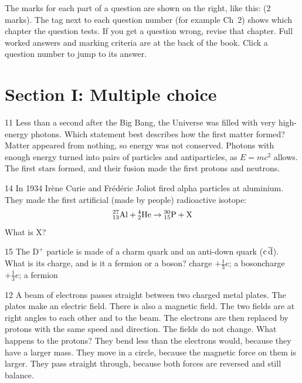 The marks for each part of a question are shown on the right, like this:
\textcolor{hscmuted}{\small(2 marks)}. The tag next to each question number (for example
\textcolor{hscbrand}{Ch~2}) shows which chapter the question tests. If you get a question
wrong, revise that chapter. Full worked answers and marking criteria are at the back of the
book. Click a question number to jump to its answer.

\section*{Section I: Multiple choice}

\begin{practiceq}{1}{1}\label{pq:bigbang}
Less than a second after the Big Bang, the Universe was filled with very high-energy photons.
Which statement best describes how the first matter formed?
  {Matter appeared from nothing, so energy was not conserved.}
  {Photons with enough energy turned into pairs of particles and antiparticles, as
   $E = mc^2$ allows.}
  {The first stars formed, and their fusion made the first protons and neutrons.}
\end{practiceq}

\begin{practiceq}{1}{4}\label{pq:joliot}
In 1934 Ir\`ene Curie and Fr\'ed\'eric Joliot fired alpha particles at aluminium. They made
the first artificial (made by people) radioactive isotope:
\[
  \pracNuc{27}{13}{Al} + \pracNuc{4}{2}{He} \to \pracNuc{30}{15}{P} + \mathrm{X}
\]
What is X?
\end{practiceq}

\begin{practiceq}{1}{5}\label{pq:dmeson}
The $\mathrm{D}^+$ particle is made of a charm quark and an anti-down quark
($\mathrm{c}\,\overline{\mathrm{d}}$). What is its charge, and is it a fermion or a boson?
  {charge $+\tfrac13 e$; a boson}{charge $+\tfrac13 e$; a fermion}
\end{practiceq}

\begin{practiceq}{1}{2}\label{pq:selector}
A beam of electrons passes straight between two charged metal plates. The plates make an
electric field. There is also a magnetic field. The two fields are at right angles to each
other and to the beam. The electrons are then replaced by protons with the same speed and
direction. The fields do not change. What happens to the protons?
  {They bend less than the electrons would, because they have a larger mass.}
  {They move in a circle, because the magnetic force on them is larger.}
  {They pass straight through, because both forces are reversed and still balance.}
\end{practiceq}

